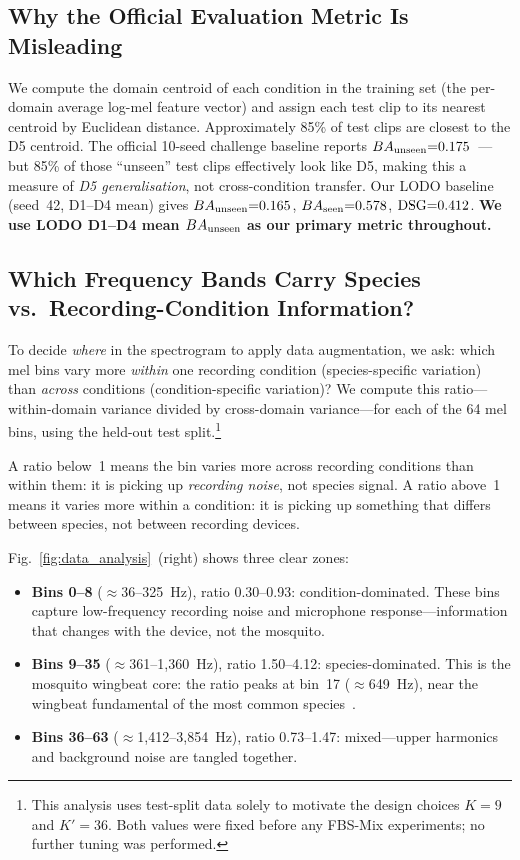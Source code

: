 \subsection{Why the Official Evaluation Metric Is Misleading}
\label{sec:data:split}

We compute the domain centroid of each condition in the training set
(the per-domain average log-mel feature vector) and assign each test
clip to its nearest centroid by Euclidean distance.
Approximately 85\% of test clips are closest to the D5 centroid.
The official 10-seed challenge baseline reports
$BA_{\text{unseen}}{=}0.175$~\cite{biodcase2026}---but 85\% of those ``unseen''
test clips effectively look like D5, making this a measure of
\emph{D5 generalisation}, not cross-condition transfer.
Our LODO baseline (seed~42, D1--D4 mean) gives
$BA_{\text{unseen}}{=}0.165$, $BA_{\text{seen}}{=}0.578$, $\mathrm{DSG}{=}0.412$.
\textbf{We use LODO D1--D4 mean $BA_{\text{unseen}}$ as our primary metric
throughout.}

\subsection{Which Frequency Bands Carry Species vs.\ Recording-Condition Information?}
\label{sec:data:freq_analysis}

To decide \emph{where} in the spectrogram to apply data augmentation,
we ask: which mel bins vary more \emph{within} one recording condition
(species-specific variation) than \emph{across} conditions
(condition-specific variation)?
We compute this ratio---within-domain variance divided by
cross-domain variance---for each of the 64 mel bins, using the
held-out test split.\footnote{This analysis uses test-split data solely
to motivate the design choices $K{=}9$ and $K'{=}36$.
Both values were fixed before any FBS-Mix experiments; no further
tuning was performed.}

A ratio below~1 means the bin varies more across recording conditions
than within them: it is picking up \emph{recording noise}, not
species signal.
A ratio above~1 means it varies more within a condition: it is
picking up something that differs between species, not between
recording devices.

Fig.~\ref{fig:data_analysis}~(right) shows three clear zones:

\begin{itemize}
  \item \textbf{Bins 0--8} ($\approx$36--325~Hz), ratio 0.30--0.93:
    condition-dominated.
    These bins capture low-frequency recording noise and microphone
    response---information that changes with the device, not the mosquito.
  \item \textbf{Bins 9--35} ($\approx$361--1{,}360~Hz), ratio 1.50--4.12:
    species-dominated.
    This is the mosquito wingbeat core: the ratio peaks at bin~17
    ($\approx$649~Hz), near the wingbeat fundamental of the most
    common species~\cite{mukundarajan2017}.
  \item \textbf{Bins 36--63} ($\approx$1{,}412--3{,}854~Hz),
    ratio 0.73--1.47: mixed---upper harmonics and background noise
    are tangled together.
\end{itemize}

